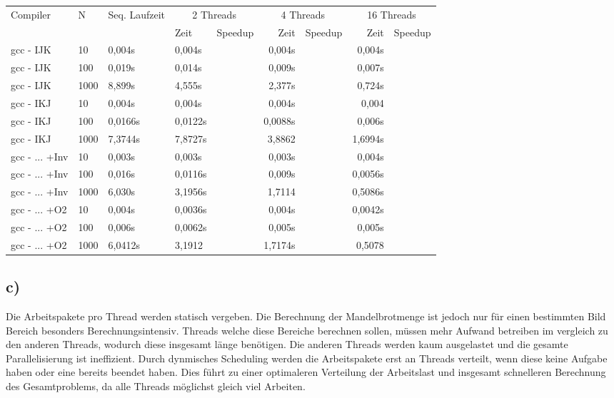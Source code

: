 \documentclass{article}
\begin{document}
			\begin{tabular}{|l|p{1cm}|p{1cm}|p{1cm}|p{1cm}|r|r|r|r|}
				\hline
			\multirow{2}{*}{Compiler} & \multirow{2}{*}{N} & \multirow{2}{*}{Seq. Laufzeit} & \multicolumn{2}{|c|}{2 Threads} & \multicolumn{2}{|c|}{4 Threads} & \multicolumn{2}{|c|}{16 Threads} \\
				& & & Zeit & Speedup & Zeit & Speedup & Zeit & Speedup \\
				\hline
				gcc - IJK & 	10 & 		0,004s &     0,004s &  &      0,004s  & &      0,004s &  \\
				\hline
				gcc - IJK & 100 &           0,019s &     0,014s &  &      0,009s  & &      0,007s & \\
				\hline
				gcc - IJK & 1000 &          8,899s &     4,555s & &        2,377s  &&       0,724s & \\
				\hline
				gcc - IKJ  & 10 & 			0,004s & 	 0,004s & & 	  0,004s &&			0,004 & \\
				\hline 
				gcc - IKJ & 100 &			0,0166s &     0,0122s &&		 0,0088s &&         0,006s & \\
				\hline 
				gcc - IKJ & 1000 & 			7,3744s & 	 7,8727s && 	  3,8862 &&         1,6994s & \\
				\hline
				gcc - ... +Inv & 10 &      0,003s &     0,003s &&       0,003s &&        0,004s & \\
				\hline
				gcc - ... +Inv & 100 &	    0,016s &     0,0116s &&       0,009s &&			0,0056s& \\
				\hline
				gcc - ... +Inv & 1000 & 	6,030s &	3,1956s &&			1,7114 &&		0,5086s& \\
				\hline
				gcc - ... +O2 & 10 &  0,004s &     0,0036s &  &      0,004s  & &      0,0042s &  \\
				\hline 
				gcc - ... +O2 & 100 & 0,006s &	  0,0062s &&		0,005s &&        0,005s & \\
				\hline 
				gcc - ... +O2 & 1000 & 6,0412s & 	3,1912 &&       1,7174s &&		  0,5078 & \\
				\hline
			\end{tabular}
		
		\subsection{c)}
			Die Arbeitspakete pro Thread werden statisch vergeben. 
			Die Berechnung der Mandelbrotmenge ist jedoch nur für einen bestimmten Bild Bereich besonders Berechnungsintensiv. 
			Threads welche diese Bereiche berechnen sollen, müssen mehr Aufwand betreiben im vergleich zu den anderen Threads, wodurch diese insgesamt länge benötigen.
			Die anderen Threads werden kaum ausgelastet und die gesamte Parallelisierung ist ineffizient.
			Durch dynmisches Scheduling werden die Arbeitspakete erst an Threads verteilt, wenn diese keine Aufgabe haben oder eine bereits beendet haben.
			Dies führt zu einer optimaleren Verteilung der Arbeitslast und insgesamt schnelleren Berechnung des Gesamtproblems, da alle Threads möglichst gleich viel Arbeiten.
	
\end{document}
